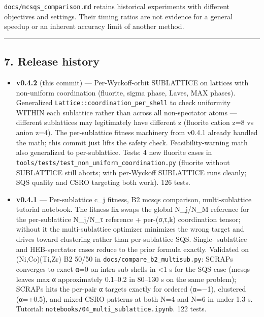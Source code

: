 \documentclass[
  11pt,
]{article}
\providecommand{\tightlist}{%
  \setlength{\itemsep}{0pt}\setlength{\parskip}{0pt}}
\begin{document}
\texttt{docs/mcsqs\_comparison.md} retains historical experiments with
different objectives and settings. Their timing ratios are not evidence
for a general speedup or an inherent accuracy limit of another method.

\begin{center}\rule{0.5\linewidth}{0.5pt}\end{center}

\subsection{7. Release history}\label{release-history}

\begin{itemize}
\tightlist
\item
  \textbf{v0.4.2} (this commit) --- Per-Wyckoff-orbit SUBLATTICE on
  lattices with non-uniform coordination (fluorite, sigma phase, Laves,
  MAX phases). Generalized \texttt{Lattice::coordination\_per\_shell} to
  check uniformity WITHIN each sublattice rather than across all
  non-spectator atoms --- different sublattices may legitimately have
  different z (fluorite cation z=8 vs anion z=4). The per-sublattice
  fitness machinery from v0.4.1 already handled the math; this commit
  just lifts the safety check. Feasibility-warning math also generalized
  to per-sublattice. Tests: 4 new fluorite cases in
  \texttt{tools/tests/test\_non\_uniform\_coordination.py} (fluorite
  without SUBLATTICE still aborts; with per-Wyckoff SUBLATTICE runs
  cleanly; SQS quality and CSRO targeting both work). 126 tests.
\item
  \textbf{v0.4.1} --- Per-sublattice c\_j fitness, B2 mcsqs comparison,
  multi-sublattice tutorial notebook. The fitness fix swaps the global
  N\_j/N\_M reference for the per-sublattice N\_j/N\_τ reference +
  per-(σ,τ,k) coordination tensor; without it the multi-sublattice
  optimizer minimizes the wrong target and drives toward clustering
  rather than per-sublattice SQS. Single- sublattice and HEB-spectator
  cases reduce to the prior formula exactly. Validated on (Ni,Co)(Ti,Zr)
  B2 50/50 in \texttt{docs/compare\_b2\_multisub.py}: SCRAPs converges
  to exact α=0 on intra-sub shells in \textless1 s for the SQS case
  (mcsqs leaves max \textbar α\textbar{} approximately 0.1--0.2 in
  80--130 s on the same problem); SCRAPs hits the per-pair α targets
  exactly for ordered (α=−1), clustered (α=+0.5), and mixed CSRO
  patterns at both N=4 and N=6 in under 1.3 s. Tutorial:
  \texttt{notebooks/04\_multi\_sublattice.ipynb}. 122 tests.

\end{itemize}
\end{document}
